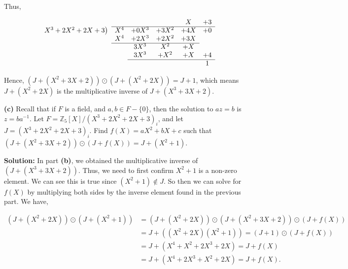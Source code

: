 \documentclass[12pt, a4paper]{article}
\begin{document}
\vspace{4mm}

\noindent Thus,

\vspace{4mm}

\[
\begin{array}{m{3.5em}cccccc}
&      &       &         &    & X & +3\\
\cline{3-7}
\multicolumn{2}{l}{X^3+2X^2+2X+3\big)}
       & X^4  &  +0X^3          & +3X^2 & +4X         & +0 \\
&      & X^4  &  +2X^3  & +2X^2 &   +3X          &  \\
\cline{3-6}
&    &  &  3X^3 &  X^2  &  +X        &   \\
&    &  &  3X^3 & +X^2  &  +X & +4 \\
\cline{4-7}
&    &    &   &  &   & 1  \\

\end{array}
\]

\vspace{4mm}

\noindent Hence, $(J+(X^2+3X+2))\odot(J+(X^2+2X))=J+1$, which means $J+(X^2+2X)$ is the multiplicative inverse of $J+(X^3+3X+2)$.

\vspace{8mm}\par

\textbf{(c)} Recall that if $F$ is a field, and $a,b\in F-\{0\}$, then the solution to $az=b$ is $z=ba^{-1}$. Let $F=\mathbb{Z}_5[X]/(X^3+2X^2+2X+3)_i$, and let $J=(X^3+2X^2+2X+3)_i$. Find $f(X)=aX^2+bX+c$ such that $(J+(X^2+3X+2))\odot(J+f(X))=J+(X^2+1)$.

\vspace{4mm}

\noindent\textbf{Solution:} In part \textbf{(b)}, we obtained the multiplicative inverse of $(J+(X^3+3X+2))$. Thus, we need to first confirm $X^2+1$ is a non-zero element. We can see this is true since $(X^2+1)\notin J$. So then we can solve for $f(X)$ by multiplying both sides by the inverse element found in the previous part. We have,

    \begin{equation*}
        \begin{split}
            (J+(X^2+2X))\odot(J+(X^2+1)) &= (J+(X^2+2X))\odot(J+(X^2+3X+2))\odot(J+f(X)) \\
            &= J+((X^2+2X)(X^2+1))=(J+1)\odot(J+f(X))\\
            &= J+(X^4+X^2+2X^3+2X)=J+f(X) \\
            &= J+(X^4+2X^3+X^2+2X)=J+f(X).
        \end{split}
    \end{equation*}
    
\end{document}
